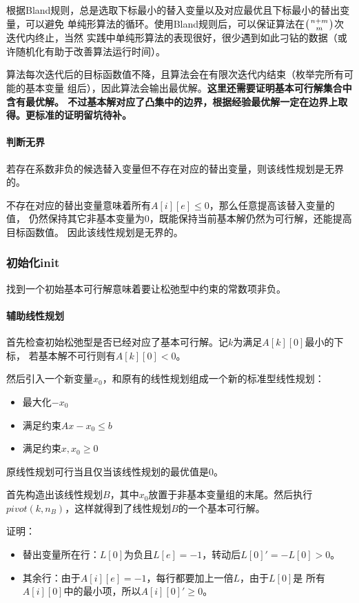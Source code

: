根据Bland规则，总是选取下标最小的替入变量以及对应最优且下标最小的替出变量，可以避免
单纯形算法的循环。使用Bland规则后，可以保证算法在$\left(n+m \atop m\right)$次迭代内终止，当然
实践中单纯形算法的表现很好，很少遇到如此刁钻的数据（或许随机化有助于改善算法运行时间）。

算法每次迭代后的目标函数值不降，且算法会在有限次迭代内结束（枚举完所有可能的基本变量
组后），因此算法会输出最优解。{\bfseries 这里还需要证明基本可行解集合中含有最优解。
不过基本解对应了凸集中的边界，根据经验最优解一定在边界上取得。更标准的证明留坑待补。}
\paragraph{判断无界}
若存在系数非负的候选替入变量但不存在对应的替出变量，则该线性规划是无界的。

不存在对应的替出变量意味着所有$A[i][e]\leq 0$，那么任意提高该替入变量的值，
仍然保持其它非基本变量为0，既能保持当前基本解仍然为可行解，还能提高目标函数值。
因此该线性规划是无界的。
\subsubsection{初始化init}
找到一个初始基本可行解意味着要让松弛型中约束的常数项非负。
\paragraph{辅助线性规划}
首先检查初始松弛型是否已经对应了基本可行解。记$k$为满足$A[k][0]$最小的下标，
若基本解不可行则有$A[k][0]<0$。

然后引入一个新变量$x_0$，和原有的线性规划组成一个新的标准型线性规划：
\begin{itemize}
    \item 最大化$-x_0$
    \item 满足约束$Ax-x_0\leq b$
    \item 满足约束$x,x_0\geq 0$
\end{itemize}
原线性规划可行当且仅当该线性规划的最优值是0。

首先构造出该线性规划$B$，其中$x_0$放置于非基本变量组的末尾。然后执行
$pivot(k,n_B)$，这样就得到了线性规划$B$的一个基本可行解。

证明：
\begin{itemize}
    \item 替出变量所在行：$L[0]$为负且$L[e]=-1$，转动后$L[0]'=-L[0]>0$。
    \item 其余行：由于$A[i][e]=-1$，每行都要加上一倍$L$，由于$L[0]$是
    所有$A[i][0]$中的最小项，所以$A[i][0]'\geq 0$。
\end{itemize}

